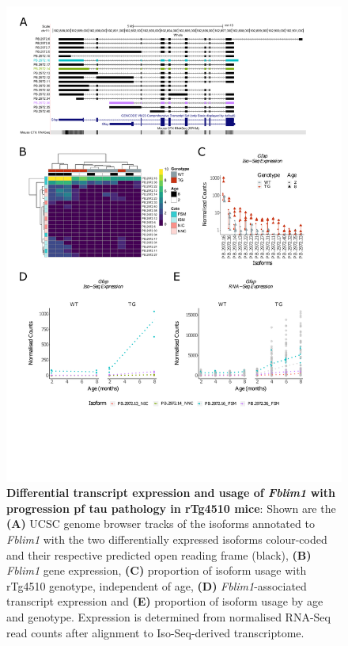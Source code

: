 \begin{figure}[!htp]
	\centering
	\includegraphics[page=6,trim={1.5cm 3cm 2cm 1cm}, scale = 0.80]{Figures/Ch5_DiffPlots.pdf}
	\captionsetup{width=0.95\textwidth}
	\caption[Differential \textit{Fblim1} transcript expression and usage]%
	{\textbf{Differential transcript expression and usage of \textit{Fblim1} with progression pf tau pathology in rTg4510 mice}: Shown are the \textbf{(A)} UCSC genome browser tracks of the isoforms annotated to \textit{Fblim1} with the two differentially expressed isoforms colour-coded and their respective predicted open reading frame (black), \textbf{(B)} \textit{Fblim1} gene expression, \textbf{(C)} proportion of isoform usage with rTg4510 genotype, independent of age, \textbf{(D)} \textit{Fblim1}-associated transcript expression and \textbf{(E)} proportion of isoform usage by age and genotype. Expression is determined from normalised RNA-Seq read counts after alignment to Iso-Seq-derived transcriptome.} 
	\label{fig:DIU_fblim1}
\end{figure}

